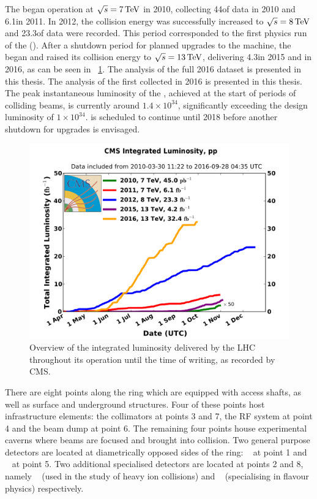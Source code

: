 The \LHC began operation at $\sqrt{s}=7\,\text{Te\hspace{-.08em}V}$ in 2010, collecting 44\ipb of data in 2010 and 6.1\ifb in 2011. In 2012, the collision energy was successfully increased to $\sqrt{s}=8\,\text{Te\hspace{-.08em}V}$ and 23.3\ifb of data were recorded. This period corresponded to the first physics run of the \LHC (\RunI). After a shutdown period for planned upgrades to the machine, the \LHC began \RunII and raised its collision energy to $\sqrt{s}=13\,\text{Te\hspace{-.08em}V}$, delivering 4.3\ifb in 2015 and \totaldatatwentysixteen\ifb in 2016, as can be seen in \Fig~\ref{fig:totalintlumi}. 
\ifNewAnalysis
The analysis of the full 2016 dataset is presented in this thesis.
\else
The analysis of the first \thisanalysislumi\ifb collected in 2016 is presented in this thesis.
\fi
The peak instantaneous luminosity of the \LHC, achieved at the start of periods of colliding beams, is currently around $1.4 \times 10^{34}$\lumiunits, significantly exceeding the design luminosity of $1 \times 10^{34}$\lumiunits. \RunII is scheduled to continue until 2018 before another shutdown for upgrades is envisaged. 

\begin{figure}[h]
\centering
\includegraphics[width=1.0\textwidth]{detectorFigures/int_lumi_cumulative_pp_2_280916.pdf}
\caption{Overview of the integrated luminosity delivered by the LHC throughout its operation until the time of writing, as recorded by CMS\quad\cite{CMSLumiPublic}.}
\label{fig:totalintlumi}
\end{figure}

There are eight points along the \LHC ring which are equipped with access shafts, as well as surface and underground structures. Four of these points host \LHC infrastructure elements: the collimators at points 3 and 7, the RF system at point 4 and the beam dump at point 6. The remaining four points house experimental caverns where beams are focused and brought into collision. Two general purpose detectors are located at diametrically opposed sides of the ring: \ATLAS~\cite{AtlasatLHC} at point 1 and \CMS~\cite{CMSatLHC} at point 5. Two additional specialised detectors are located at points 2 and 8, namely \ALICE~\cite{AliceatLHC} (used in the study of heavy ion collisions) and \LHCb~\cite{LHCbatLHC} (specialising in flavour physics) respectively. 



